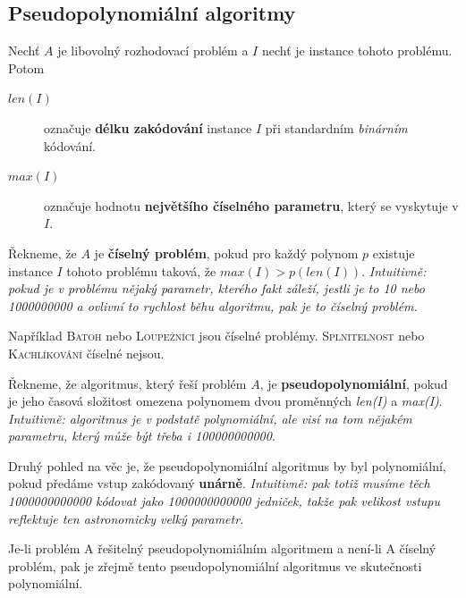 \documentclass[11pt]{report} %
\numberwithin{equation}{section}
\begin{document}
\subsection{Pseudopolynomiální algoritmy}
Nechť $A$ je libovolný rozhodovací problém a $I$ nechť je instance tohoto problému. Potom 
\begin{description}
	
	
	\item[$len(I)$] označuje \textbf{délku zakódování} instance $I$ při standardním \textit{binárním} kódování.
	\item[$max(I)$] označuje hodnotu \textbf{největšího číselného parametru}, který se vyskytuje v $I$.
\end{description}
Řekneme, že $A$ je \textbf{číselný problém}, pokud pro každý polynom $p$ existuje instance $I$ tohoto problému taková, že
$max(I) > p(len(I))$. \textit{Intuitivně: pokud je v problému nějaký parametr, kterého fakt záleží, jestli je to 10 nebo 1000000000 a ovlivní to rychlost běhu algoritmu, pak je to číselný problém.}

Například \textsc{Batoh} nebo \textsc{Loupežníci} jsou číselné problémy. \textsc{Splnitelnost} nebo \textsc{Kachlíkování} číselné nejsou.

Řekneme, že algoritmus, který řeší problém $A$, je \textbf{pseudopolynomiální}, pokud je jeho časová složitost omezena
polynomem dvou proměnných \textit{len(I)} a \textit{max(I)}. \textit{Intuitivně: algoritmus je v podstatě polynomiální, ale visí na tom nějakém parametru, který může být třeba i 100000000000. }

Druhý pohled na věc je, že pseudopolynomiální algoritmus by byl polynomiální, pokud předáme vstup zakódovaný \textbf{unárně}. \textit{Intuitivně: pak totiž musíme těch 1000000000000 kódovat jako 1000000000000 jedniček, takže pak velikost vstupu reflektuje ten astronomicky velký parametr.}

Je-li problém A řešitelný pseudopolynomiálním algoritmem a není-li A číselný problém, pak je zřejmě tento pseudopolynomiální algoritmus ve skutečnosti polynomiální. 
\end{document}
